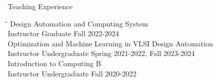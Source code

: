 \begin{rSection}{Teaching Experience}

\begin{tabbing}
\hspace{3.5in}\= \hspace{1.5in}\= \kill
Design Automation and Computing System \\
  Instructor \> Graduate \> \hfill {Fall 2022-2024} \\
Optimization and Machine Learning in VLSI Design Automation \\
  Instructor \> Undergraduate \> \hfill {Spring 2021-2022, Fall 2023-2024} \\
Introduction to Computing B \\
  Instructor \> Undergraduate \> \hfill {Fall 2020-2022} \\
\end{tabbing}

\end{rSection}
